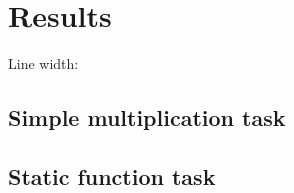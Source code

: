 \section{Results}

Line width: \prntlen{\linewidth}

\subsection{Simple multiplication task}


\subsection{Static function task}

